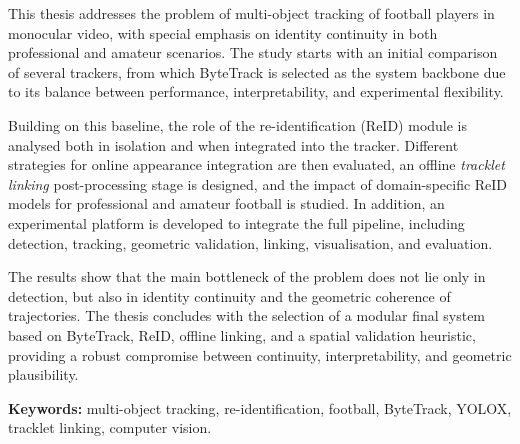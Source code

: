 \documentclass[12pt, a4paper, twoside]{article}
\begin{document}
	This thesis addresses the problem of multi-object tracking of football players in monocular video, with special emphasis on identity continuity in both professional and amateur scenarios. The study starts with an initial comparison of several trackers, from which ByteTrack is selected as the system backbone due to its balance between performance, interpretability, and experimental flexibility.
	
	Building on this baseline, the role of the re-identification (ReID) module is analysed both in isolation and when integrated into the tracker. Different strategies for online appearance integration are then evaluated, an offline \textit{tracklet linking} post-processing stage is designed, and the impact of domain-specific ReID models for professional and amateur football is studied. In addition, an experimental platform is developed to integrate the full pipeline, including detection, tracking, geometric validation, linking, visualisation, and evaluation.
	
	The results show that the main bottleneck of the problem does not lie only in detection, but also in identity continuity and the geometric coherence of trajectories. The thesis concludes with the selection of a modular final system based on ByteTrack, ReID, offline linking, and a spatial validation heuristic, providing a robust compromise between continuity, interpretability, and geometric plausibility.
	
	\textbf{Keywords:} multi-object tracking, re-identification, football, ByteTrack, YOLOX, tracklet linking, computer vision.
	
	
	\clearpage
	\tableofcontents
	\newpage
	
	
	
	
	
	
	
	
	
	
	
	
	
	
	
	
	
	
	\printbibliography[heading=bibintoc,title={Referencias}]
	
	
	
	
\end{document}
